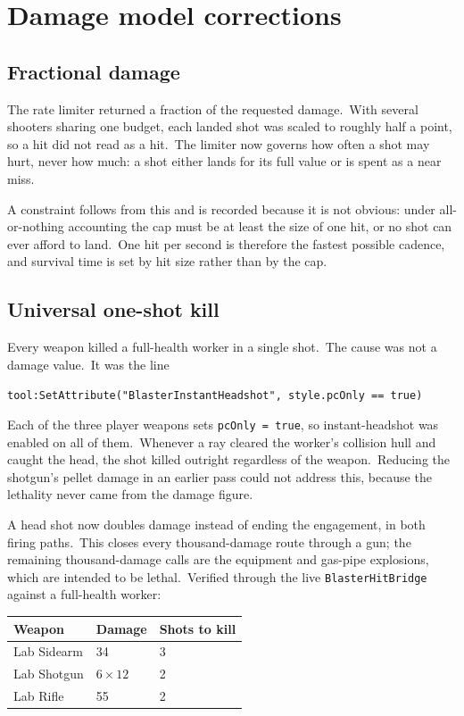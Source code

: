 \section{Damage model corrections}

\subsection{Fractional damage}
The rate limiter returned a fraction of the requested damage.\ With several
shooters sharing one budget, each landed shot was scaled to roughly half a
point, so a hit did not read as a hit.\ The limiter now governs how often a
shot may hurt, never how much: a shot either lands for its full value or is
spent as a near miss.\

A constraint follows from this and is recorded because it is not obvious: under
all-or-nothing accounting the cap must be at least the size of one hit, or no
shot can ever afford to land.\ One hit per second is therefore the fastest
possible cadence, and survival time is set by hit size rather than by the cap.\

\subsection{Universal one-shot kill}
Every weapon killed a full-health worker in a single shot.\ The cause was not a
damage value.\ It was the line

\begin{center}
\texttt{tool:SetAttribute("BlasterInstantHeadshot", style.pcOnly == true)}
\end{center}

Each of the three player weapons sets \texttt{pcOnly = true}, so instant-headshot
was enabled on all of them.\ Whenever a ray cleared the worker's collision hull
and caught the head, the shot killed outright regardless of the weapon.\
Reducing the shotgun's pellet damage in an earlier pass could not address this,
because the lethality never came from the damage figure.\

A head shot now doubles damage instead of ending the engagement, in both firing
paths.\ This closes every thousand-damage route through a gun; the remaining
thousand-damage calls are the equipment and gas-pipe explosions, which are
intended to be lethal.\ Verified through the live \texttt{BlasterHitBridge}
against a full-health worker:

\begin{center}
\begin{tabular}{@{}lll@{}}
\toprule
\textbf{Weapon} & \textbf{Damage} & \textbf{Shots to kill} \\
\midrule
Lab Sidearm & 34 & 3 \\
Lab Shotgun & $6\times12$ & 2 \\
Lab Rifle & 55 & 2 \\
\bottomrule
\end{tabular}
\end{center}

